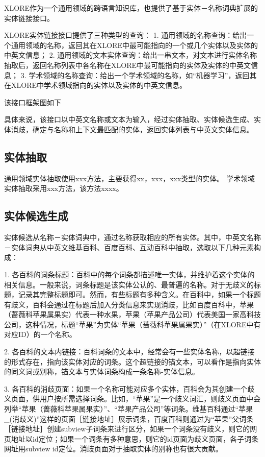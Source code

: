 XLORE作为一个通用领域的跨语言知识库，也提供了基于实体－名称词典扩展的实体链接接口。

XLORE实体链接接口提供了三种类型的查询：
1.  通用领域的名称查询：给出一个通用领域的名称，返回其在XLORE中最可能指向的一个或几个实体以及实体的中英文信息；
2.  通用领域的文本实体查询：给出一串文本，对文本进行实体名称抽取后，返回名称列表中各名称在XLORE中最可能指向的实体及实体的中英文信息；
3.  学术领域的名称查询：给出一个学术领域的名称，如“机器学习”，返回其在XLORE中学术领域指向的实体以及实体的中英文信息。

该接口框架图如下

具体来说，该接口以中英文名称或文本为输入，经过实体抽取、实体候选生成、实体消歧，确定与名称和上下文最匹配的实体，返回实体列表与中英文实体信息。


\subsection{实体抽取}
通用领域实体抽取使用xxx方法，主要获得xx，xxx，xxx类型的实体。
学术领域实体抽取采用xxx方法，该方法xxxx。

\subsection{实体候选生成}

实体候选从名称－实体词典中，通过名称获取相应的所有实体。其中，中英文名称－实体词典从中英文维基百科、百度百科、互动百科中抽取，选取以下几种元素构成：

1.  各百科的词条标题：百科中的每个词条都描述唯一实体，并维护着这个实体的相关信息。一般来说，词条标题是该实体公认的、最普遍的名称。对于无歧义的标题，记录其完整标题即可。然而，有些标题有多种含义。在百科中，如果一个标题有歧义，百科会通过在标题后加入分类信息来实现消歧，比如百度百科中，苹果（蔷薇科苹果属果实）代表一种水果，苹果（苹果产品公司）代表美国一家高科技公司，这种情况，标题“苹果”为实体“苹果（蔷薇科苹果属果实）”（在XLORE中有对应ID）的一个名称。

2.  各百科的文本内链接：百科词条的文本中，经常会有一些实体名称，以超链接的形式存在，指向该实体对应的词条。这个超链接的锚文本，可以看作是指向实体的同义词或别称，锚文本与实体词条构成一条名称-实体信息。

3.  各百科的消歧页面：如果一个名称可能对应多个实体，百科会为其创建一个歧义页面，供用户按所需选择词条。比如，“苹果”是一个歧义词汇，则歧义页面中会列举“苹果（蔷薇科苹果属果实）”、“苹果产品公司”等词条。维基百科通过“苹果\_(消歧义)”这样的页面［链接地址］展示词条，百度百科则通过为“苹果”父词条［链接地址］创建subview子词条来进行区分，如果一个词条没有歧义，则它的网页地址以id定位；如果一个词条有多种意思，则它的id页面为歧义页面，各子词条网址用subview id定位。消歧页面对于抽取实体的别称也有很大贡献。


